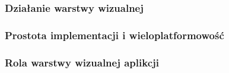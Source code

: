 \subsubsection{Działanie warstwy wizualnej}
\subsubsection{Prostota implementacji i wieloplatformowość}

\subsubsection{Rola warstwy wizualnej aplikcji}

